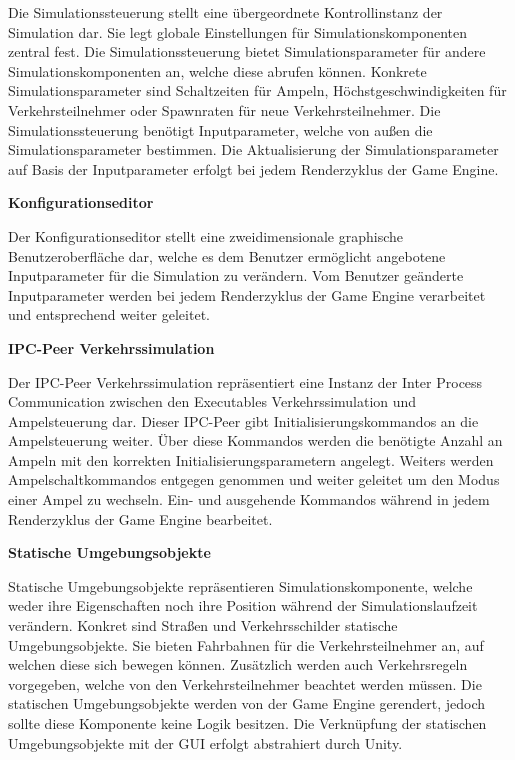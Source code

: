 Die Simulationssteuerung stellt eine übergeordnete Kontrollinstanz der Simulation dar. Sie legt globale Einstellungen für Simulationskomponenten zentral fest. Die Simulationssteuerung bietet Simulationsparameter für andere Simulationskomponenten an, welche diese abrufen können. Konkrete Simulationsparameter sind Schaltzeiten für Ampeln, Höchstgeschwindigkeiten für Verkehrsteilnehmer oder Spawnraten für neue Verkehrsteilnehmer. Die Simulationssteuerung benötigt Inputparameter, welche von außen die Simulationsparameter bestimmen. Die Aktualisierung der Simulationsparameter auf Basis der Inputparameter erfolgt bei jedem Renderzyklus der Game Engine.

\begin{flushleft}
\textbf{Konfigurationseditor}
\end{flushleft}
\vspace{-0.3 cm}

Der Konfigurationseditor stellt eine zweidimensionale graphische Benutzeroberfläche dar, welche es dem Benutzer ermöglicht angebotene Inputparameter für die Simulation zu verändern. Vom Benutzer geänderte Inputparameter werden bei jedem Renderzyklus der Game Engine verarbeitet und entsprechend weiter geleitet.

\begin{flushleft}
\textbf{IPC-Peer Verkehrssimulation}
\end{flushleft}
\vspace{-0.3 cm}

Der IPC-Peer Verkehrssimulation repräsentiert eine Instanz der Inter Process Communication zwischen den Executables Verkehrssimulation und Ampelsteuerung dar. Dieser IPC-Peer gibt Initialisierungskommandos an die Ampelsteuerung weiter. Über diese Kommandos werden die benötigte Anzahl an Ampeln mit den korrekten Initialisierungsparametern angelegt. Weiters werden Ampelschaltkommandos entgegen genommen und weiter geleitet um den Modus einer Ampel zu wechseln. Ein- und ausgehende Kommandos während in jedem Renderzyklus der Game Engine bearbeitet.

\begin{flushleft}
\textbf{Statische Umgebungsobjekte}
\end{flushleft}
\vspace{-0.3 cm}

Statische Umgebungsobjekte repräsentieren Simulationskomponente, welche weder ihre Eigenschaften noch ihre Position während der Simulationslaufzeit verändern. Konkret sind Straßen und Verkehrsschilder statische Umgebungsobjekte. Sie bieten Fahrbahnen für die Verkehrsteilnehmer an, auf welchen diese sich bewegen können. Zusätzlich werden auch Verkehrsregeln vorgegeben, welche von den Verkehrsteilnehmer beachtet werden müssen. Die statischen Umgebungsobjekte werden von der Game Engine gerendert, jedoch sollte diese Komponente keine Logik besitzen. Die Verknüpfung der statischen Umgebungsobjekte mit der GUI erfolgt abstrahiert durch Unity.

